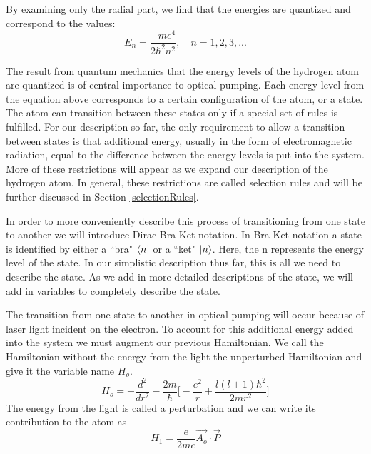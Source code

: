 \documentclass[letter,12pt]{article}
\begin{document}
		By examining only the radial part, we find that the energies
		are quantized and correspond to the values:
		\begin{equation}
			E_n=\frac{-me^4}{2\hbar^2n^2},\quad n=1,2,3,...
		\end{equation}

		The result from quantum mechanics that the energy levels 
		of the hydrogen atom are 
		quantized is of central importance to optical pumping. 
		Each energy level from the equation above 
		corresponds to a certain configuration of the 
		atom, or a state. The atom can transition 
        between these states
		only if a special set of rules is fulfilled. 
        For our description so far, the only requirement
        to allow a transition between states
        is that additional energy, usually in the 
        form of electromagnetic radiation, 
        equal to the difference
        between the energy levels is put into the system. 
        More of these restrictions will appear as we
        expand our description of the hydrogen atom.
        In general, these restrictions 
        are called selection rules and will be further
        discussed in 
        Section \ref{selectionRules}.

        In order to more conveniently describe 
        this process of transitioning from one state to another
        we will introduce Dirac Bra-Ket notation. In 
        Bra-Ket notation a state is identified by 
        either a ``bra" $\bra{n}$
        or a ``ket" $\ket{n}$. Here, the n represents the energy
		level of the state. In our simplistic description thus far, 
		this is all we need to describe the state.
		As we add in more detailed descriptions of 
		the state, we will add in variables to completely 
		describe the state.

		The transition from one state to another in optical pumping
		will occur because of laser light incident on the electron.
		To account for this additional energy added into the system 
		we must augment
		our previous Hamiltonian. We call the Hamiltonian without 
		the energy from the light the unperturbed Hamiltonian and 
		give it the variable name $H_o$.
		\begin{equation}
			H_o=-\frac{d^2}{dr^2}-\frac{2m}{\hbar}\Big[-\frac{e^2}{r} + \frac{l(l+1)\hbar^2}{2mr^2}\Big]
		\end{equation}
		The energy from the light is called a perturbation and we
		can write its contribution to the atom as 
		\begin{equation}
			H_1=\frac{e}{2mc} \vec{A_o} \cdotp \vec{P}
		\end{equation}
\end{document}
